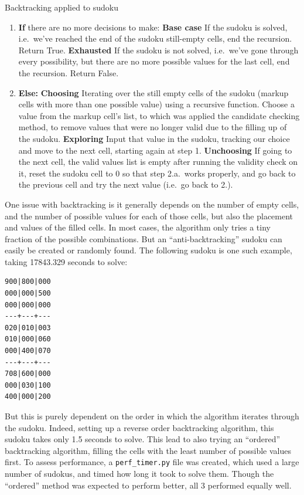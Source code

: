 \documentclass[12pt]{report} %
\begin{document}
\begin{examplebox}{Backtracking applied to sudoku}

    \begin{enumerate}
      \item \textbf{If} there are no more decisions to make:
      \textbf{Base case} If the sudoku is solved, i.e.\ we've reached the end of the sudoku still-empty cells, end the recursion. Return True.
      \textbf{Exhausted} If the sudoku is not solved, i.e.\ we've gone through every possibility, but there are no more possible values for the last cell, end the recursion. Return False.
      \item \textbf{Else:}
       \textbf{Choosing} Iterating over the still empty cells of the sudoku (markup cells with more than one possible value) using a recursive function. Choose a value from the markup cell's list, to which was applied the candidate checking method, to remove values that were no longer valid due to the filling up of the sudoku.
       \textbf{Exploring} Input that value in the sudoku, tracking our choice and move to the next cell, starting again at step 1.
       \textbf{Unchoosing} If going to the next cell, the valid values list is empty after running the validity check on it, reset the sudoku cell to 0 so that step 2.a.\ works properly, and go back to the previous cell and try the next value (i.e.\ go back to 2.).

    \end{enumerate}

\end{examplebox}


One issue with backtracking is it generally depends on the number of empty cells, and the number of possible values for each of those cells, but also the placement and values of the filled cells. In most cases, the algorithm only tries a tiny fraction of the possible combinations. But an ``anti-backtracking'' sudoku can easily be created or randomly found. The following sudoku is one such example, taking 17843.329 seconds to solve\cite{stackoverflow_optimizing_backtracking_sudoku}:

\begin{lstlisting}[caption={anti\_backtracking.txt sudoku}]
900|800|000
000|000|500
000|000|000
---+---+---
020|010|003
010|000|060
000|400|070
---+---+---
708|600|000
000|030|100
400|000|200
\end{lstlisting}

But this is purely dependent on the order in which the algorithm iterates through the sudoku. Indeed, setting up a reverse order backtracking algorithm, this sudoku takes only 1.5 seconds to solve. This lead to also trying an ``ordered'' backtracking algorithm, filling the cells with the least number of possible values first\cite{stackoverflow_optimizing_backtracking_sudoku}. To assess performance, a \texttt{perf\_timer.py} file was created, which used a large number of sudokus\cite{kaggle_sudoku_dataset}, and timed how long it took to solve them. Though the ``ordered'' method was expected to perform better, all 3 performed equally well.
\end{document}
